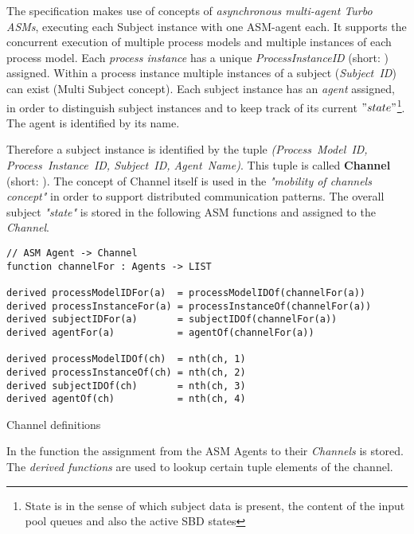 The specification makes use of concepts of \textit{asynchronous multi-agent Turbo ASMs}, executing each Subject instance with one ASM-agent each. It supports the concurrent execution of multiple process models and multiple instances of each process model. 
Each \textit{process instance} has a unique \textit{ProcessInstanceID} (short: ) assigned. 
Within a process instance multiple instances of a subject (\textit{Subject~ID}) can exist (Multi Subject concept). Each subject instance has an \textit{agent} assigned, in order to distinguish subject instances and to keep track of its current $"state"$\footnote{State is in the sense of which subject data is present, the content of the input pool queues and also the active SBD states}. The agent is identified by its name.

Therefore a subject instance is identified by the tuple \textit{(Process~Model~ID, Process~Instance~ID, Subject~ID, Agent~Name)}. This tuple is called \textbf{Channel} (short: ). The concept of Channel itself is used in the \textit{"mobility of channels concept"} in order to support distributed communication patterns. The overall subject \textit{"state"} is stored in the following ASM functions and assigned to the \textit{Channel}.

\begin{listing}[htbp]
\begin{verbatim}
// ASM Agent -> Channel
function channelFor : Agents -> LIST

derived processModelIDFor(a)  = processModelIDOf(channelFor(a))
derived processInstanceFor(a) = processInstanceOf(channelFor(a))
derived subjectIDFor(a)       = subjectIDOf(channelFor(a))
derived agentFor(a)           = agentOf(channelFor(a))

derived processModelIDOf(ch)  = nth(ch, 1)
derived processInstanceOf(ch) = nth(ch, 2)
derived subjectIDOf(ch)       = nth(ch, 3)
derived agentOf(ch)           = nth(ch, 4)
\end{verbatim}
\caption{Channel definitions}
\label{lst:shortasm:channelFor}
\end{listing}

In the function  the assignment from the ASM Agents to their \textit{Channels} is stored.
The \textit{derived functions} are used to lookup certain tuple elements of the channel.\\



